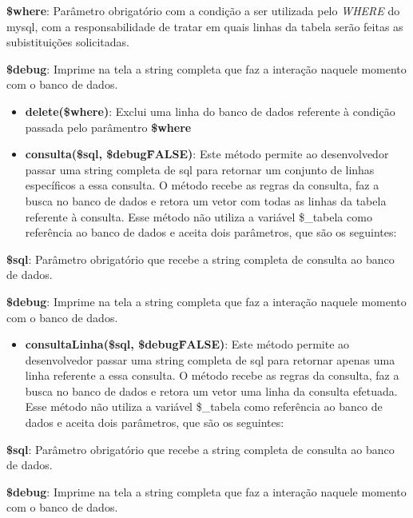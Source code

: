                     \item\textbf{\$where}: Parâmetro obrigatório com a condição a ser utilizada pelo \emph{WHERE} do mysql, com a responsabilidade de tratar em quais linhas da tabela serão feitas as subistituições solicitadas.
                    \item\textbf{\$debug}: Imprime na tela a string completa que faz a interação naquele momento com o banco de dados.
                \begin{itemize}

                \item\textbf{delete(\$where)}: Exclui uma linha do banco de dados referente à condição passada pelo parâmentro \textbf{\$where}

                \item\textbf{consulta(\$sql, \$debug\=FALSE)}: Este método permite ao desenvolvedor passar uma string completa de sql para retornar um conjunto de linhas específicos a essa consulta. O método recebe as regras da consulta, faz a busca no banco de dados e retora um vetor com todas as linhas da tabela referente à consulta. Esse método não utiliza a variável \$\_tabela como referência ao banco de dados e aceita dois parâmetros, que são os seguintes:
                \end{itemize}
                    \item\textbf{\$sql}: Parâmetro obrigatório que recebe a string completa de consulta ao banco de dados.
                    \item\textbf{\$debug}: Imprime na tela a string completa que faz a interação naquele momento com o banco de dados.
                \begin{itemize}

                \item\textbf{consultaLinha(\$sql, \$debug\=FALSE)}: Este método permite ao desenvolvedor passar uma string completa de sql para retornar apenas uma linha referente a essa consulta. O método recebe as regras da consulta, faz a busca no banco de dados e retora um vetor uma linha da consulta efetuada. Esse método não utiliza a variável \$\_tabela como referência ao banco de dados e aceita dois parâmetros, que são os seguintes:
                \end{itemize}
                    \item\textbf{\$sql}: Parâmetro obrigatório que recebe a string completa de consulta ao banco de dados.
                    \item\textbf{\$debug}: Imprime na tela a string completa que faz a interação naquele momento com o banco de dados.
